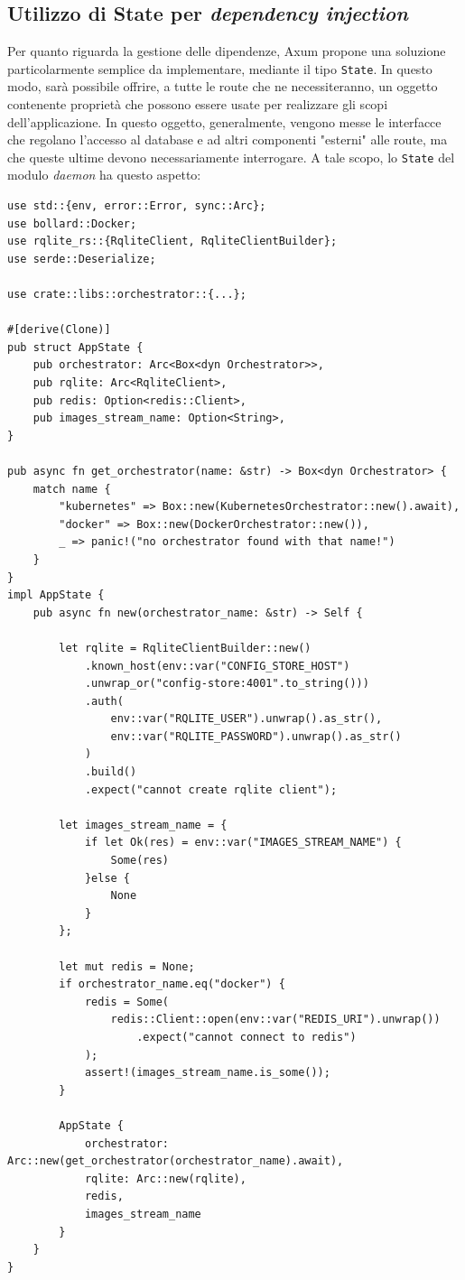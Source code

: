 \subsection{Utilizzo di State per \textit{dependency injection}}
Per quanto riguarda la gestione delle dipendenze, Axum propone una soluzione particolarmente semplice da implementare, mediante il tipo \verb|State|. In questo modo, sarà possibile offrire, a tutte le route che ne necessiteranno, un oggetto contenente proprietà che possono essere usate per realizzare gli scopi dell'applicazione. In questo oggetto, generalmente, vengono messe le interfacce che regolano l'accesso al database e ad altri componenti "esterni" alle route, ma che queste ultime devono necessariamente interrogare.
\newline
A tale scopo, lo \verb|State| del modulo \textit{daemon} ha questo aspetto:
\begin{verbatim}
use std::{env, error::Error, sync::Arc};
use bollard::Docker;
use rqlite_rs::{RqliteClient, RqliteClientBuilder};
use serde::Deserialize;

use crate::libs::orchestrator::{...};

#[derive(Clone)]
pub struct AppState {
    pub orchestrator: Arc<Box<dyn Orchestrator>>,
    pub rqlite: Arc<RqliteClient>,
    pub redis: Option<redis::Client>, 
    pub images_stream_name: Option<String>,
}

pub async fn get_orchestrator(name: &str) -> Box<dyn Orchestrator> {
    match name {
        "kubernetes" => Box::new(KubernetesOrchestrator::new().await),
        "docker" => Box::new(DockerOrchestrator::new()),
        _ => panic!("no orchestrator found with that name!")
    }
}
impl AppState {
    pub async fn new(orchestrator_name: &str) -> Self {

        let rqlite = RqliteClientBuilder::new()
            .known_host(env::var("CONFIG_STORE_HOST")
            .unwrap_or("config-store:4001".to_string()))
            .auth(
                env::var("RQLITE_USER").unwrap().as_str(), 
                env::var("RQLITE_PASSWORD").unwrap().as_str()
            )
            .build()
            .expect("cannot create rqlite client");

        let images_stream_name = {
            if let Ok(res) = env::var("IMAGES_STREAM_NAME") {
                Some(res)
            }else {
                None
            }
        };

        let mut redis = None;
        if orchestrator_name.eq("docker") {
            redis = Some(
                redis::Client::open(env::var("REDIS_URI").unwrap())
                    .expect("cannot connect to redis")
            );
            assert!(images_stream_name.is_some());
        }

        AppState { 
            orchestrator: Arc::new(get_orchestrator(orchestrator_name).await),
            rqlite: Arc::new(rqlite),
            redis,
            images_stream_name
        }
    }
}
\end{verbatim}
